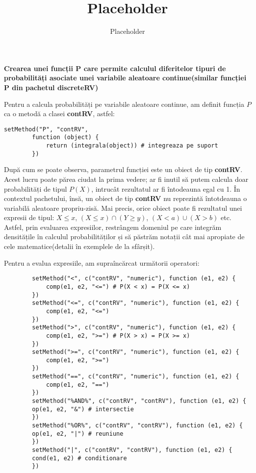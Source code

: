 \documentclass[12pt]{article}
\title{Placeholder}
\author{Placeholder}
\begin{document}
	\textbf{Crearea unei funcții P care permite calculul diferitelor tipuri de probabilități asociate
		unei variabile aleatoare continue(similar funcției P din pachetul discreteRV) }\vspace{5mm}
	
	Pentru a calcula probabilități pe variabile aleatoare continue, am definit funcția $P$ ca o metodă a clasei \textbf{contRV}, astfel:
	\begin{lstlisting}[numbers=none]
		setMethod("P", "contRV",
		function (object) {
			return (integrala(object)) # integreaza pe suport
		})
	\end{lstlisting}

	După cum se poate observa, parametrul funcției este un obiect de tip \textbf{contRV}. Acest lucru poate părea ciudat la prima vedere; ar fi inutil să putem calcula doar probabilități de tipul $P(X)$, intrucât rezultatul ar fi întodeauna egal cu 1. În contextul pachetului, însă, un obiect de tip \textbf{contRV} nu reprezintă întotdeauna o variabilă aleatoare propriu-zisă. Mai precis, orice obiect poate fi rezultatul unei expresii de tipul: $X \leq x$, $(X \leq x) \cap  (Y \geq y)$, $(X < a) \cup (X > b)$ etc. Astfel, prin evaluarea expresiilor, restrângem domeniul pe care integrăm densitățile în calculul probabilităților și să păstrăm notații cât mai apropiate de cele matematice(detalii în exemplele de la sfârșit).\par
	
	Pentru a evalua expresiile, am supraîncărcat următorii operatori:
	\begin{lstlisting}
		setMethod("<", c("contRV", "numeric"), function (e1, e2) {
			comp(e1, e2, "<=") # P(X < x) = P(X <= x)
		})
		setMethod("<=", c("contRV", "numeric"), function (e1, e2) {
			comp(e1, e2, "<=")
		})
		setMethod(">", c("contRV", "numeric"), function (e1, e2) {
			comp(e1, e2, ">=") # P(X > x) = P(X >= x)
		})
		setMethod(">=", c("contRV", "numeric"), function (e1, e2) {
			comp(e1, e2, ">=")
		})
		setMethod("==", c("contRV", "numeric"), function (e1, e2) {
			comp(e1, e2, "==")
		})
		setMethod("%AND%", c("contRV", "contRV"), function (e1, e2) {
		op(e1, e2, "&") # intersectie
		})
		setMethod("%OR%", c("contRV", "contRV"), function (e1, e2) {
		op(e1, e2, "|") # reuniune
		})
		setMethod("|", c("contRV", "contRV"), function (e1, e2) {
		cond(e1, e2) # conditionare
		})
	\end{lstlisting}\pagebreak
\end{document}
